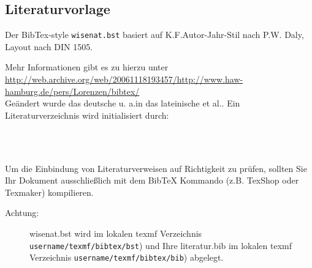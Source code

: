 \documentclass[english, trackchanges, hyperref, ngerman ,pdf, mp, mppdf]{wise}
\newcommand\code[1]{\texttt{#1}}
\begin{document}
\subsection{Literaturvorlage}\label{sec_literaturvorlage}

Der BibTex-style  \code{wisenat.bst} basiert auf K.F.Autor-Jahr-Stil nach P.W. Daly, Layout nach DIN 1505.




 Mehr Informationen gibt es zu hierzu unter\\ \url{http://web.archive.org/web/20061118193457/http://www.haw-hamburg.de/pers/Lorenzen/bibtex/} \\
Geändert wurde das deutsche \glqq u. a.\grqq in das lateinische \glqq et al.\grqq. 
Ein Literaturverzeichnis wird initialisiert durch:
\begin{verbatim}
  
  
\end{verbatim}
Um die Einbindung von Literaturverweisen auf Richtigkeit zu prüfen, sollten Sie Ihr Dokument ausschließlich mit dem BibTeX Kommando (z.B. TexShop oder Texmaker) kompilieren. 

\begin{description}
\item [Achtung:]  wisenat.bst  wird im lokalen texmf Verzeichnis \code{username/texmf/bibtex/bst}) und Ihre literatur.bib im lokalen texmf Verzeichnis  \code{username/texmf/bibtex/bib}) abgelegt.
\end{description}
\end{document}

